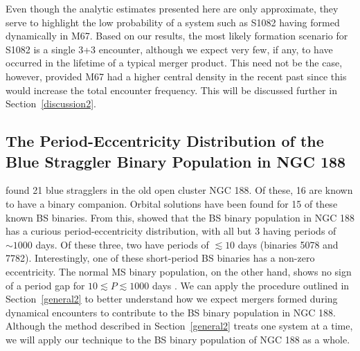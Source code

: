 Even though the analytic estimates presented here are only approximate,
they serve to 
highlight the low probability of a system such as S1082 having formed
dynamically in M67.  Based on our results, the most likely formation
scenario for S1082 is 
a single 3+3 encounter, although we expect very few, if any, to have
occurred in the lifetime of a typical merger product.  This need not
be the case, however, provided M67 had a 
higher central density in the recent past since this would increase
the total encounter frequency.  This will be discussed further in
Section~\ref{discussion2}.  

\subsection{The Period-Eccentricity Distribution of the Blue Straggler
  Binary Population in NGC 188}

\citet{mathieu09} found 21 blue stragglers in the old open cluster NGC
188.  Of these, 16 are known to have a binary companion.  Orbital
solutions have been found for 15 of these known BS binaries.  From
this, \citet{mathieu09} showed that the BS binary population in NGC
188 has a curious 
period-eccentricity distribution, with all but 3 having periods of
$\sim 1000$ days.  Of these three, two have periods of $\lesssim 10$
days (binaries 5078 and 7782).  Interestingly, one of these
short-period BS binaries has a non-zero
eccentricity.  The normal MS binary population, on the other hand, shows
no sign of a period gap for $10 \lesssim P \lesssim 1000$ days
\citep{mathieu09}.  We can apply the procedure outlined in
Section~\ref{general2} to better understand how we expect mergers
formed during dynamical encounters to contribute to the BS binary
population in NGC 188.  Although the method described in
Section~\ref{general2} treats one system at a time, we will apply our
technique to the BS binary population of NGC 188 as a whole.


